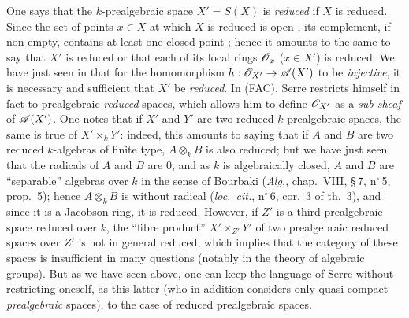 \begin{env}[10.10.4]
\label{IV.10.10.4}
One says that the $k$-prealgebraic space $X'=S(X)$ is \emph{reduced} if $X$ is reduced. Since the set of points $x\in X$ at which $X$ is reduced is open , its complement, if non-empty, contains at least one closed point ; hence it amounts to the same to say that $X'$ is reduced or that each of its local rings $\mathscr{O}_x$ ($x\in X'$) is reduced. We have just seen in  that for the homomorphism $h:\mathscr{O}_{X'}\to\mathscr{A}(X')$ to be \emph{injective}, it is necessary and sufficient that $X'$ be \emph{reduced}.
In (FAC), Serre restricts himself in fact to prealgebraic \emph{reduced} spaces, which allows him to define $\mathscr{O}_{X'}$ as a \emph{sub-sheaf} of $\mathscr{A}(X')$.
One notes that if $X'$ and $Y'$ are two reduced $k$-prealgebraic spaces, the same is true of $X'\times_k Y'$: indeed, this amounts to saying that if $A$ and $B$ are two reduced $k$-algebras of finite type, $A\otimes_k B$ is also reduced; but we have just seen that the radicals of $A$ and $B$ are $0$, and as $k$ is algebraically closed, $A$ and $B$ are ``separable'' algebras over $k$ in the sense of Bourbaki (\emph{Alg.}, chap.~VIII, \S\,7, n$^\circ$\,5, prop.~5); hence $A\otimes_k B$ is without radical (\emph{loc.\ cit.}, n$^\circ$\,6, cor.~3 of th.~3), and since it is a Jacobson ring, it is reduced.
However, if $Z'$ is a third prealgebraic space reduced over $k$, the ``fibre product'' $X'\times_{Z'}Y'$ of two prealgebraic reduced spaces over $Z'$ is not in general reduced, which implies that the category of these spaces is insufficient in many questions (notably in the theory of algebraic groups).
But as we have seen above, one can keep the language of Serre without restricting oneself, as this latter (who in addition considers only quasi-compact \emph{prealgebraic} spaces), to the case of reduced prealgebraic spaces.
\end{env}


